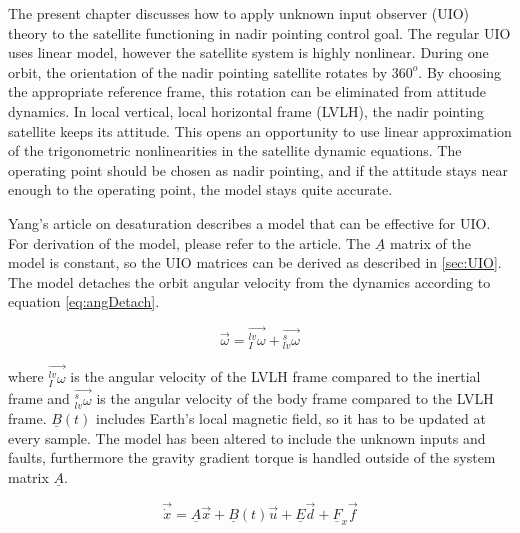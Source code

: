 The present chapter discusses how to apply unknown input observer (UIO) theory to the satellite functioning in nadir pointing control goal. The regular UIO uses linear model, however the satellite system is highly nonlinear.  During one orbit, the orientation of the nadir pointing satellite rotates by $360^o$. By choosing the appropriate reference frame, this rotation can be eliminated from attitude dynamics. In local vertical, local horizontal frame (LVLH), the nadir pointing satellite keeps its attitude. This opens an opportunity to use linear approximation of the trigonometric nonlinearities in the satellite dynamic equations. The operating point should be chosen as nadir pointing, and if the attitude stays near enough to the operating point, the model stays quite accurate.


Yang's article on desaturation \cite{DesatYang} describes a model that can be effective for UIO. For derivation of the model, please refer to the article. The $\underline{A}$ matrix of the model is constant, so the UIO matrices can be derived as described in \ref{sec:UIO}. The model detaches the orbit angular velocity from the dynamics according to equation \ref{eq:angDetach}.

\begin{equation}
\label{eq:angDetach}
\vec{\omega} = \vec{_I^{lv}\omega} + \vec{_{lv}^s\omega}
\end{equation}

where $\vec{_I^{lv}\omega}$ is the angular velocity of the LVLH frame compared to the inertial frame and $\vec{_{lv}^s\omega}$ is the angular velocity of the body frame compared to the LVLH frame. $\underline{B}(t)$ includes Earth's local magnetic field, so it has to be updated at every sample. The model has been altered to include the unknown inputs and faults, furthermore the gravity gradient torque is handled outside of the system matrix $\underline{A}$.

\begin{equation}
\vec{\dot{x}} =
\underline{A}\vec{x} + \underline{B}(t)\vec{u} + \underline{E} \vec{d} + \underline{F}_x \vec{f} 
\label{eq:uioagain}
\end{equation}

